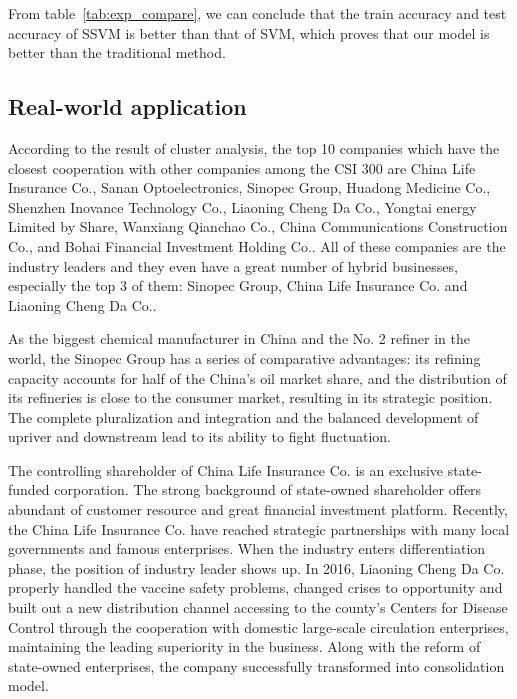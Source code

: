From table~\ref{tab:exp_compare}, we can conclude that the train
accuracy and test accuracy of SSVM is better than that of SVM,
which proves that our model is better than the traditional
method.

\subsection{Real-world application}
\label{sec:exp_strategy}

According to the result of cluster analysis, the top 10 companies
which have the closest cooperation with other companies among the
CSI 300 are China Life Insurance Co., Sanan Optoelectronics,
Sinopec Group, Huadong Medicine Co., Shenzhen Inovance Technology
Co., Liaoning Cheng Da Co., Yongtai energy Limited by Share,
Wanxiang Qianchao Co., China Communications Construction Co., and
Bohai Financial Investment Holding Co.. All of these companies
are the industry leaders and they even have a great number of
hybrid businesses, especially the top 3 of them: Sinopec Group,
China Life Insurance Co. and Liaoning Cheng Da Co..

As the biggest chemical manufacturer in China and the No. 2
refiner in the world, the Sinopec Group has a series of
comparative advantages: its refining capacity accounts for half
of the China’s oil market share, and the distribution of its
refineries is close to the consumer market, resulting in its
strategic position. The complete pluralization and integration
and the balanced development of upriver and downstream lead to
its ability to fight fluctuation.

The controlling shareholder of China Life Insurance Co. is an
exclusive state-funded corporation. The strong background of
state-owned shareholder offers abundant of customer resource and
great financial investment platform. Recently, the China Life
Insurance Co. have reached strategic partnerships with many local
governments and famous enterprises. When the industry enters
differentiation phase, the position of industry leader shows up.
In 2016, Liaoning Cheng Da Co. properly handled the vaccine
safety problems, changed crises to opportunity and built out a
new distribution channel accessing to the county’s Centers for
Disease Control through the cooperation with domestic large-scale
circulation enterprises, maintaining the leading superiority in
the business. Along with the reform of state-owned enterprises,
the company successfully transformed into consolidation model.



